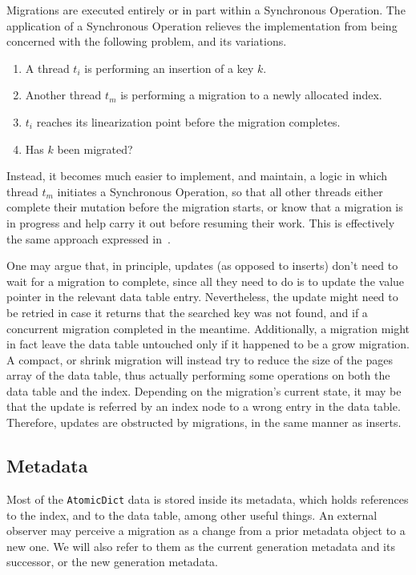 Migrations are executed entirely or in part within a Synchronous Operation.
The application of a Synchronous Operation relieves the implementation from being concerned with the following problem, and its variations.
\begin{enumerate}
    \item A thread $t_i$ is performing an insertion of a key $k$.
    \item Another thread $t_m$ is performing a migration to a newly allocated index.
    \item $t_i$ reaches its linearization point before the migration completes.
    \item Has $k$ been migrated?
\end{enumerate}
Instead, it becomes much easier to implement, and maintain, a logic in which thread $t_m$ initiates a Synchronous Operation, so that all other threads either complete their mutation before the migration starts, or know that a migration is in progress and help carry it out before resuming their work.
This is effectively the same approach expressed in~\cite[\S5.3.2, Preventing Concurrent Updates to Ensure Consistency]{maier}.

One may argue that, in principle, updates (as opposed to inserts) don't need to wait for a migration to complete, since all they need to do is to update the value pointer in the relevant data table entry.
Nevertheless, the update might need to be retried in case it returns that the searched key was not found, and if a concurrent migration completed in the meantime.
Additionally, a migration might in fact leave the data table untouched only if it happened to be a grow migration.
A compact, or shrink migration will instead try to reduce the size of the pages array of the data table, thus actually performing some operations on both the data table and the index.
Depending on the migration's current state, it may be that the update is referred by an index node to a wrong entry in the data table.
Therefore, updates are obstructed by migrations, in the same manner as inserts.

\subsection{Metadata}\label{subsec:metadata}
Most of the \texttt{AtomicDict} data is stored inside its metadata, which holds references to the index, and to the data table, among other useful things.
An external observer may perceive a migration as a change from a prior metadata object to a new one.
We will also refer to them as the current generation metadata and its successor, or the new generation metadata.


